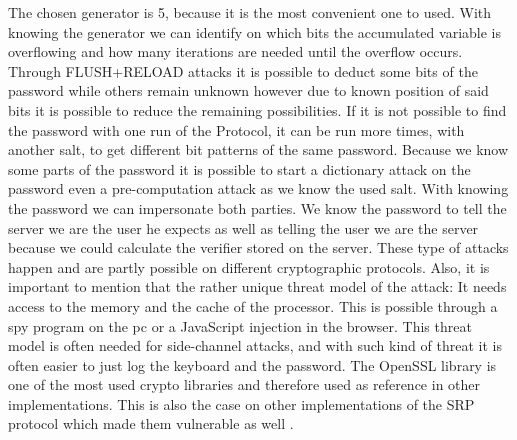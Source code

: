 \documentclass[journal]{IEEEtran}
\begin{document}
The chosen generator is 5, because it is the most convenient one to used. With knowing the generator we can identify on which bits the accumulated variable is overflowing and how many iterations are needed until the overflow occurs.
Through FLUSH+RELOAD attacks it is possible to deduct some bits of the password while others remain unknown however due to known position of said bits it is possible to reduce the remaining possibilities. 
If it is not possible to find the password with one run of the Protocol, it can be run more times, with another salt, to get different bit patterns of the same password.
Because we know some parts of the password it is possible to start a dictionary attack on the password even a pre-computation attack as we know the used salt.
With knowing the password we can impersonate both parties. We know the password to tell the server we are the user he expects as well as telling the user we are the server because we could calculate the verifier stored on the server.    
These type of attacks happen and are partly possible on different cryptographic protocols. Also, it is important to mention that the rather unique threat model of the attack:
It needs access to the memory and the cache of the processor. This is possible through a spy program on the pc or a JavaScript injection in the browser. 
This threat model is often needed for side-channel attacks, and with such kind of threat it is often easier to just log the keyboard and the password.
The OpenSSL library is one of the most used crypto libraries and therefore used as reference in other implementations. This is also the case on other implementations of the SRP protocol which made them vulnerable as well \cite{de2021parasite}.
\end{document}
